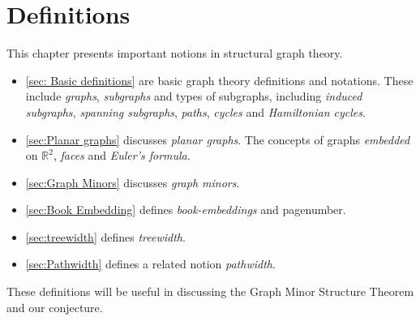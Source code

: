 \chapter{Definitions}\label{chap:Definitions}
This chapter presents important notions in structural graph theory.
\begin{itemize}
	\item \cref{sec: Basic definitions} are basic graph theory definitions and notations. These include \textit{graphs}, \textit{subgraphs} and types of subgraphs, including \textit{induced subgraphs,} \textit{spanning subgraphs}, \textit{paths}, \textit{cycles} and \textit{Hamiltonian cycles}. 
	\item \cref{sec:Planar graphs} discusses \textit{planar graphs}. The concepts of graphs \textit{embedded} on $\mathbb{R}^2$, \textit{faces} and \textit{Euler's formula}.
	\item \cref{sec:Graph Minors} discusses \textit{graph minors}.
	\item \cref{sec:Book Embedding} defines \textit{book-embeddings} and pagenumber.
	\item \cref{sec:treewidth} defines \textit{treewidth}.
	\item \cref{sec:Pathwidth} defines a related notion \textit{pathwidth}.
\end{itemize}
These definitions will be useful in discussing the Graph Minor Structure Theorem and our conjecture.













